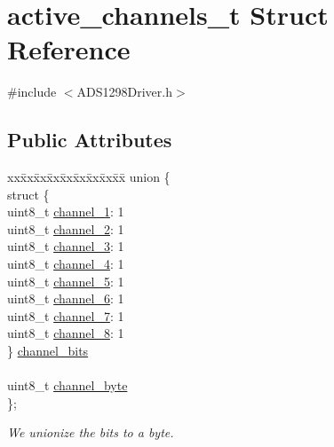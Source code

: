 \hypertarget{structactive__channels__t}{\section{active\-\_\-channels\-\_\-t \-Struct \-Reference}
\label{structactive__channels__t}
}


{\ttfamily \#include $<$\-A\-D\-S1298\-Driver.\-h$>$}

\subsection*{\-Public \-Attributes}
\begin{DoxyCompactItemize}
\item 
\begin{tabbing}
xx\=xx\=xx\=xx\=xx\=xx\=xx\=xx\=xx\=\kill
union \{\\
\>struct \{\\
\>\>uint8\_t \hyperlink{structactive__channels__t_aa5ca3c312df986cbdd27521862898ea2}{channel\_1}: 1\\
\>\>uint8\_t \hyperlink{structactive__channels__t_abc7078c4e6fa549941ff3e0d2fb1e2f4}{channel\_2}: 1\\
\>\>uint8\_t \hyperlink{structactive__channels__t_ad68b7e88f03d812fe0225882936447c4}{channel\_3}: 1\\
\>\>uint8\_t \hyperlink{structactive__channels__t_a9ecd322b0ff8a67f4fd202a744b799f6}{channel\_4}: 1\\
\>\>uint8\_t \hyperlink{structactive__channels__t_a7d77374691523079291fd04089f364c6}{channel\_5}: 1\\
\>\>uint8\_t \hyperlink{structactive__channels__t_a28dd6831fc9e9abcb8c484bd806d4b51}{channel\_6}: 1\\
\>\>uint8\_t \hyperlink{structactive__channels__t_a2bc29deaea047a36824f03159e3d0158}{channel\_7}: 1\\
\>\>uint8\_t \hyperlink{structactive__channels__t_ab91881cb0fd2ec1f8fd59e30e8fc279b}{channel\_8}: 1\\
\>\} \hyperlink{structactive__channels__t_a7856ced3f539238aa3a3287a775690b4}{channel\_bits}\\
\>\>\\
\>uint8\_t \hyperlink{structactive__channels__t_a68c8307495350c21226b0a541c219486}{channel\_byte}\\
\}; \\

\end{tabbing}\begin{DoxyCompactList}\small\item\em \-We unionize the bits to a byte. \end{DoxyCompactList}\end{DoxyCompactItemize}


